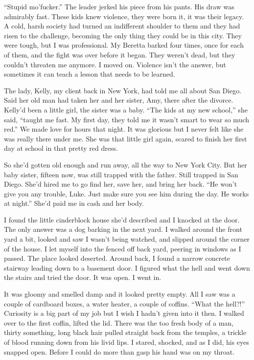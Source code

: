 ``Stupid mo'fucker.'' The leader jerked his piece
from his pants. His draw was admirably fast. These kids knew
violence, they were born it, it was their legacy. A cold, harsh
society had turned an indifferent shoulder to them and they had
risen to the challenge, becoming the only thing they could be in
this city. They were tough, but I was professional. My Beretta
barked four times, once for each of them, and the fight was over
before it began. They weren't dead, but they couldn't
threaten me anymore. I moved on. Violence isn't the answer,
but sometimes it can teach a lesson that needs to be learned.



The lady, Kelly, my client back in New York, had told me all about
San Diego. Said her old man had taken her and her sister, Amy,
there after the divorce. Kelly'd been a little girl, the
sister was a baby. ``The kids at my new school,'' she
said, ``taught me fast. My first day, they told me it
wasn't smart to wear so much red.'' We made love for
hours that night. It was glorious but I never felt like she was
really there under me. She was that little girl again, scared to
finish her first day at school in that pretty red dress.



So she'd gotten old enough and run away, all the way to New
York City. But her baby sister, fifteen now, was still trapped with
the father. Still trapped in San Diego. She'd hired me to go
find her, save her, and bring her back. ``He won't give
you any trouble, Luke. Just make sure you see him during the day.
He works at night.'' She'd paid me in cash and her
body.



I found the little cinderblock house she'd described and I
knocked at the door. The only answer was a dog barking in the next
yard. I walked around the front yard a bit, looked and saw I
wasn't being watched, and slipped around the corner of the
house. I let myself into the fenced off back yard, peering in
windows as I passed. The place looked deserted. Around back, I
found a narrow concrete stairway leading down to a basement door. I
figured what the hell and went down the stairs and tried the door.
It was open. I went in.



It was gloomy and smelled damp and it looked pretty empty. All I
saw was a couple of cardboard boxes, a water heater, a couple of
coffins. ``What the hell?!'' Curiosity is a big part of
my job but I wish I hadn't given into it then. I walked over
to the first coffin, lifted the lid. There was the too fresh body
of a man, thirty something, long black hair pulled straight back
from the temples, a trickle of blood running down from his livid
lips. I stared, shocked, and as I did, his eyes snapped open.
Before I could do more than gasp his hand was on my throat.




